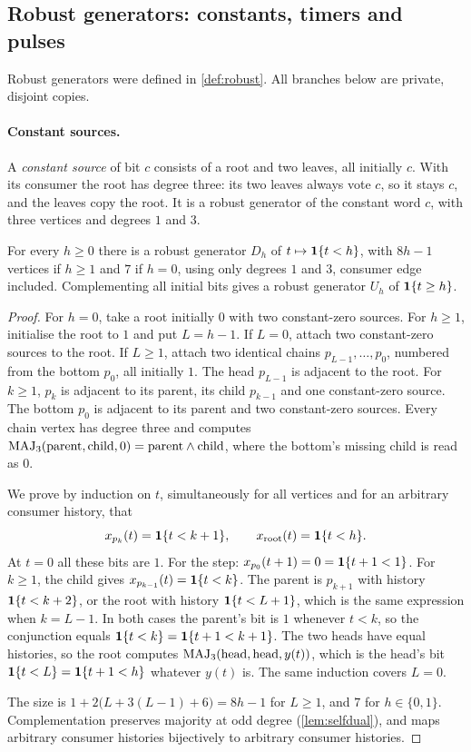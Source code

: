 \subsection{Robust generators: constants, timers and pulses}\label{sec:timers}

Robust generators were defined in \cref{def:robust}. All branches below are private, disjoint copies.

\paragraph{Constant sources.} A \emph{constant source} of bit $c$ consists of a root and two leaves,
all initially $c$. With its consumer the root has degree three: its two leaves always vote $c$, so
it stays $c$, and the leaves copy the root. It is a robust generator of the constant word $c$, with
three vertices and degrees $1$ and $3$.

\begin{lemma}[Timers]\label{lem:timers}
For every $h\ge 0$ there is a robust generator $D_h$ of $t\mapsto\mathbf{1}\{t<h\}$, with $8h-1$ vertices
if $h\ge 1$ and $7$ if $h=0$, using only degrees $1$ and $3$, consumer edge included. Complementing
all initial bits gives a robust generator $U_h$ of $\mathbf{1}\{t\ge h\}$.
\end{lemma}

\begin{proof}
For $h=0$, take a root initially $0$ with two constant-zero sources. For $h\ge 1$, initialise the
root to $1$ and put $L=h-1$. If $L=0$, attach two constant-zero sources to the root. If $L\ge 1$,
attach two identical chains $p_{L-1},\dots,p_0$, numbered from the bottom $p_0$, all initially
$1$. The head $p_{L-1}$ is adjacent to the root. For $k\ge 1$, $p_k$ is adjacent to its parent,
its child $p_{k-1}$ and one constant-zero source. The bottom $p_0$ is adjacent to its parent and two
constant-zero sources. Every chain vertex has degree three and computes
$\operatorname{MAJ}_3(\text{parent},\text{child},0)=\text{parent}\wedge\text{child}$, where the bottom's missing
child is read as $0$.

We prove by induction on $t$, simultaneously for all vertices and for an arbitrary consumer history,
that
\[
x_{p_k}(t)=\mathbf{1}\{t<k+1\},\qquad x_{\mathrm{root}}(t)=\mathbf{1}\{t<h\}.
\]
At $t=0$ all these bits are $1$. For the step: $x_{p_0}(t+1)=0=\mathbf{1}\{t+1<1\}$. For $k\ge 1$, the
child gives $x_{p_{k-1}}(t)=\mathbf{1}\{t<k\}$. The parent is $p_{k+1}$ with history $\mathbf{1}\{t<k+2\}$, or the
root with history $\mathbf{1}\{t<L+1\}$, which is the same expression when $k=L-1$. In both cases the
parent's bit is $1$ whenever $t<k$, so the conjunction equals $\mathbf{1}\{t<k\}=\mathbf{1}\{t+1<k+1\}$. The two
heads have equal histories, so the root computes $\operatorname{MAJ}_3(\text{head},\text{head},y(t))$, which is the
head's bit $\mathbf{1}\{t<L\}=\mathbf{1}\{t+1<h\}$ whatever $y(t)$ is. The same induction covers $L=0$.

The size is $1+2\bigl(L+3(L-1)+6\bigr)=8h-1$ for $L\ge1$, and $7$ for $h\in\{0,1\}$. Complementation
preserves majority at odd degree (\cref{lem:selfdual}), and maps arbitrary consumer histories
bijectively to arbitrary consumer histories.
\end{proof}

